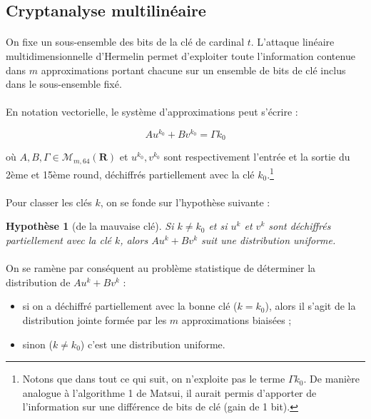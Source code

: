\documentclass{scrartcl}
\newtheorem*{hypo}{Hypothèse}
\begin{document}
\subsection{Cryptanalyse multilinéaire}

\paragraph*{}
On fixe un sous-ensemble des bits de la clé de cardinal $t$. L'attaque linéaire multidimensionnelle d'Hermelin \cite{TheseHermelin}
permet d'exploiter toute l'information contenue dans $m$ approximations portant chacune sur un ensemble de bits de clé inclus
dans le sous-ensemble fixé.

\paragraph*{}
En notation vectorielle, le système d'approximations peut s'écrire :

$$Au^{k_0}+Bv^{k_0}=\Gamma k_0$$

où $A,B,\Gamma\in\mathcal{M}_{m,64}(\mathbf{R})$ et $u^{k_0}, v^{k_0}$ sont respectivement l'entrée et la sortie du 2ème et
15ème round, déchiffrés partiellement avec la clé $k_0$.\footnote{Notons que dans tout ce qui suit, on n'exploite pas
le terme $\Gamma k_0$. De manière analogue à l'algorithme 1 de Matsui, il aurait permis d'apporter de l'information
sur une différence de bits de clé (gain de 1 bit).}

\paragraph*{}
Pour classer les clés $k$, on se fonde sur l'hypothèse suivante :

\begin{hypo}[de la mauvaise clé]
	Si $k\neq k_0$ et si $u^{k}$ et $v^{k}$ sont déchiffrés partiellement avec la clé $k$, alors
$Au^{k}+Bv^{k}$ suit une distribution uniforme.
\end{hypo}

\paragraph*{}
On se ramène par conséquent au problème statistique de déterminer la distribution de $Au^{k}+Bv^{k}$ :

\begin{itemize}
	\item si on a déchiffré partiellement avec la bonne clé ($k=k_0$), alors il s'agit de la distribution jointe
	formée par les $m$ approximations biaisées ;
	\item sinon ($k\neq k_0$) c'est une distribution uniforme.
\end{itemize}
\end{document}
